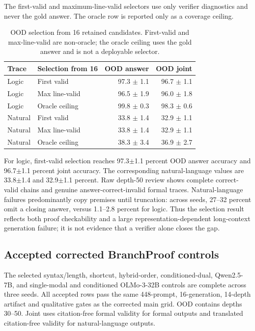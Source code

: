 \documentclass[10pt]{article}
\begin{document}
The first-valid and maximum-line-valid selectors use only verifier diagnostics and never the
gold answer. The oracle row is reported only as a coverage ceiling.

\begin{table}[H]
\centering
\scriptsize
\begin{tabular}{llrr}
\toprule
Trace & Selection from 16 & OOD answer & OOD joint \\
\midrule
Logic & First valid & 97.3 $\pm$ 1.1 & 96.7 $\pm$ 1.1 \\
Logic & Max line-valid & 96.5 $\pm$ 1.9 & 96.0 $\pm$ 1.8 \\
Logic & Oracle ceiling & 99.8 $\pm$ 0.3 & 98.3 $\pm$ 0.6 \\
Natural & First valid & 33.8 $\pm$ 1.4 & 32.9 $\pm$ 1.1 \\
Natural & Max line-valid & 33.8 $\pm$ 1.4 & 32.9 $\pm$ 1.1 \\
Natural & Oracle ceiling & 38.3 $\pm$ 3.4 & 36.9 $\pm$ 2.7 \\
\bottomrule
\end{tabular}
\caption{OOD selection from 16 retained candidates. First-valid and max-line-valid are
non-oracle; the oracle ceiling uses the gold answer and is not a deployable selector.}
\end{table}

For logic, first-valid selection reaches
97.3$\pm$1.1
percent OOD answer accuracy and
96.7$\pm$1.1
percent joint accuracy. The corresponding natural-language values are
33.8$\pm$1.4
and 32.9$\pm$1.1 percent.
Raw depth-50 review shows complete correct-valid chains and genuine answer-correct-invalid
formal traces. Natural-language failures predominantly copy premises until truncation: across
seeds, 27--32 percent omit a closing answer, versus 1.1--2.8 percent for logic. Thus the
selection result reflects both proof checkability and a large representation-dependent
long-context generation failure; it is not evidence that a verifier alone closes the gap.



\subsection{Accepted corrected BranchProof controls}
The selected syntax/length, shortcut, hybrid-order, conditioned-dual, Qwen2.5-7B, and
single-modal and conditioned OLMo-3-32B controls are complete across three seeds. All accepted rows
pass the same 448-prompt, 16-generation, 14-depth artifact and qualitative gates as the corrected
main grid. OOD contains depths 30--50. Joint uses citation-free formal validity for formal
outputs and translated citation-free validity for natural-language outputs.
\end{document}
